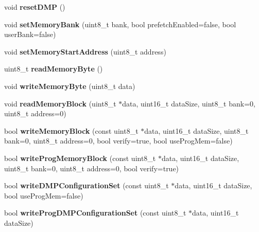 \begin{DoxyCompactItemize}
void {\bfseries reset\+D\+MP} ()
\item 
\mbox{\label{class_m_p_u6050_aa0c1753f6d2dacb1942fbef156a075bc}} 
void {\bfseries set\+Memory\+Bank} (uint8\+\_\+t bank, bool prefetch\+Enabled=false, bool user\+Bank=false)
\item 
\mbox{\label{class_m_p_u6050_a45013abb39103e858d432cc720bc351a}} 
void {\bfseries set\+Memory\+Start\+Address} (uint8\+\_\+t address)
\item 
\mbox{\label{class_m_p_u6050_a4fb50ebcff2f4e686e3fbbafb70a1f75}} 
uint8\+\_\+t {\bfseries read\+Memory\+Byte} ()
\item 
\mbox{\label{class_m_p_u6050_a20de45af9109402f0cfe785f8fdbf439}} 
void {\bfseries write\+Memory\+Byte} (uint8\+\_\+t data)
\item 
\mbox{\label{class_m_p_u6050_a04d8d5e7b62605aed15f07f52afa74ca}} 
void {\bfseries read\+Memory\+Block} (uint8\+\_\+t $\ast$data, uint16\+\_\+t data\+Size, uint8\+\_\+t bank=0, uint8\+\_\+t address=0)
\item 
\mbox{\label{class_m_p_u6050_aae135772b45e1c7968b55f4f01b3757f}} 
bool {\bfseries write\+Memory\+Block} (const uint8\+\_\+t $\ast$data, uint16\+\_\+t data\+Size, uint8\+\_\+t bank=0, uint8\+\_\+t address=0, bool verify=true, bool use\+Prog\+Mem=false)
\item 
\mbox{\label{class_m_p_u6050_a201dc0aa819f451584c575c5a7590e10}} 
bool {\bfseries write\+Prog\+Memory\+Block} (const uint8\+\_\+t $\ast$data, uint16\+\_\+t data\+Size, uint8\+\_\+t bank=0, uint8\+\_\+t address=0, bool verify=true)
\item 
\mbox{\label{class_m_p_u6050_abe4f64f68164116b2ec94fe1d987929a}} 
bool {\bfseries write\+D\+M\+P\+Configuration\+Set} (const uint8\+\_\+t $\ast$data, uint16\+\_\+t data\+Size, bool use\+Prog\+Mem=false)
\item 
\mbox{\label{class_m_p_u6050_a160a3d018a81eb85a33874a43f44b3ea}} 
bool {\bfseries write\+Prog\+D\+M\+P\+Configuration\+Set} (const uint8\+\_\+t $\ast$data, uint16\+\_\+t data\+Size)

\end{DoxyCompactItemize}
